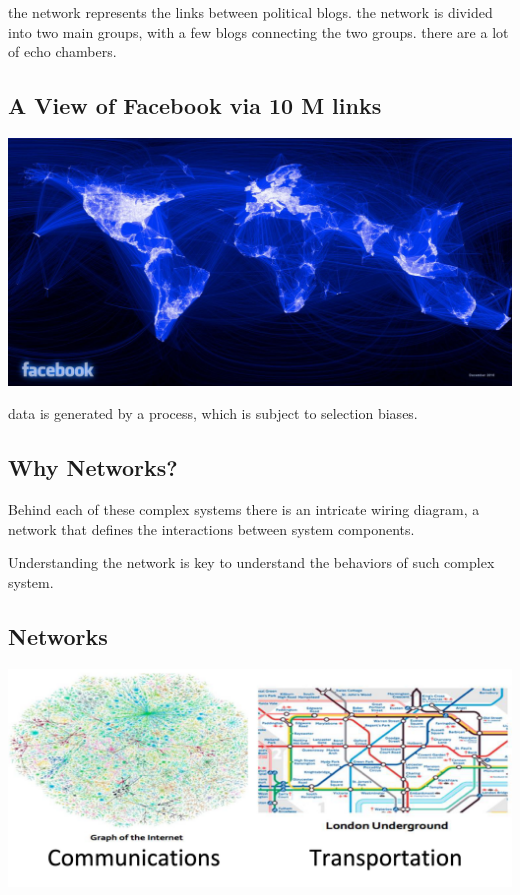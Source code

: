 \documentclass[11pt]{article}
\theoremstyle{definition}
\begin{document}
the network represents the links between political blogs.
the network is divided into two main groups, with a few blogs
connecting the two groups. there are a lot of echo chambers.
\subsection{A View of Facebook via 10 M links}
\includegraphics[width=\textwidth/2]{3.png}

data is generated by a process, which is subject to selection biases.

\subsection{Why Networks?}
Behind each of these complex systems there
is an intricate wiring diagram, a network that
defines the interactions between system
components.

Understanding the network is key to understand
the behaviors of such complex system.

\subsection{Networks}
\includegraphics[width=\textwidth/2]{4.png}
\end{document}
